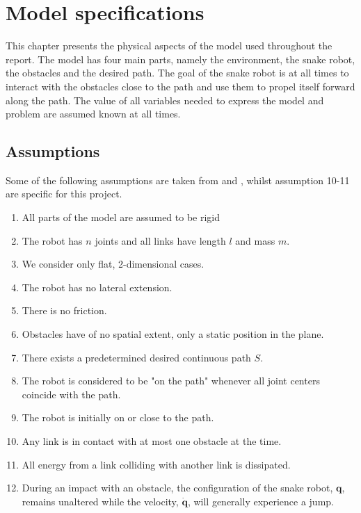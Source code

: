 \chapter{Model specifications} \label{ch:model_specs}

This chapter presents the physical aspects of the model used throughout the report. The model has four main parts, namely the environment, the snake robot, the obstacles and the desired path. The goal of the snake robot is at all times to interact with the obstacles close to the path and use them to propel itself forward along the path. The value of all variables needed to express the model and problem are assumed known at all times.

\section{Assumptions}

Some of the following assumptions are taken from \cite{StavdahlNote} and \cite{liljeback2010hybrid}, whilst assumption 10-11 are specific for this project.

\begin{enumerate}
    \item All parts of the model are assumed to be rigid
    \item The robot has $n$ joints and all links have length $l$ and mass $m$.
    \item We consider only flat, 2-dimensional cases.
    \item The robot has no lateral extension.
    \item There is no friction. 
    \item Obstacles have of no spatial extent, only a static position in the plane.
    \item There exists a predetermined desired continuous path $S$.
    \item The robot is considered to be "on the path" whenever all joint centers coincide with the path.
    \item The robot is initially on or close to the path.
    \item Any link is in contact with at most one obstacle at the time.
    \item All energy from a link colliding with another link is dissipated.
    \item During an impact with an obstacle, the configuration of the snake robot, $\mathbf{q}$, remains unaltered while the velocity, $\mathbf{\dot{q}}$, will generally experience a jump.
\end{enumerate}

